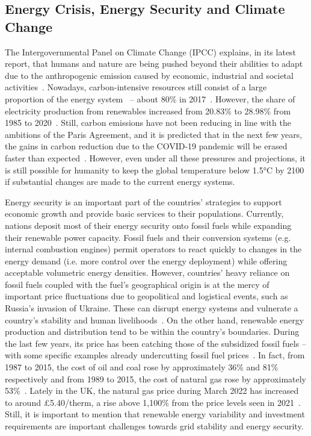 \subsection{Energy Crisis, Energy Security and Climate Change}

The Intergovernmental Panel on Climate Change (IPCC) explains, in its latest report, that humans and nature are being pushed beyond their abilities to adapt due to the anthropogenic emission caused by economic, industrial and societal activities~\cite{IPCC2022Portner}. Nowadays, carbon-intensive resources still consist of a large proportion of the energy system~\cite{IPCC2022Portner} – about 80\% in 2017~\cite{raturi2019renewables}. However, the share of electricity production from renewables increased from 20.83\% to 28.98\% from 1985 to 2020~\cite{BP2021bp}. Still, carbon emissions have not been reducing in line with the ambitions of the Paris Agreement, and it is predicted that in the next few years, the gains in carbon reduction due to the COVID-19 pandemic will be erased faster than expected~\cite{WEO2021IEA}. However, even under all these pressures and projections, it is still possible for humanity to keep the global temperature below 1.5°C by 2100 if substantial changes are made to the current energy systems.

Energy security is an important part of the countries’ strategies to support economic growth and provide basic services to their populations. Currently, nations deposit most of their energy security onto fossil fuels while expanding their renewable power capacity. Fossil fuels and their conversion systems (e.g. internal combustion engines) permit operators to react quickly to changes in the energy demand (i.e. more control over the energy deployment) while offering acceptable volumetric energy densities. However, countries’ heavy reliance on fossil fuels coupled with the fuel’s geographical origin is at the mercy of important price fluctuations due to geopolitical and logistical events, such as Russia’s invasion of Ukraine. These can disrupt energy systems and vulnerate a country’s stability and human livelihoods~\cite{bhattacharyya2009fossil,russiagas}. On the other hand, renewable energy production and distribution tend to be within the country's boundaries. During the last few years, its price has been catching those of the subsidized fossil fuels – with some specific examples already undercutting fossil fuel prices~\cite{IRENA2021Renewable}. In fact, from 1987 to 2015, the cost of oil and coal rose by approximately 36\% and 81\% respectively and from 1989 to 2015, the cost of natural gas rose by approximately 53\%~\cite{BP2016bp}. Lately in the UK, the natural gas price during March 2022 has increased to around £5.40/therm, a rise above 1,100\% from the price levels seen in 2021~\cite{T2022UKNatureGas}. Still, it is important to mention that renewable energy variability and investment requirements are important challenges towards grid stability and energy security.

